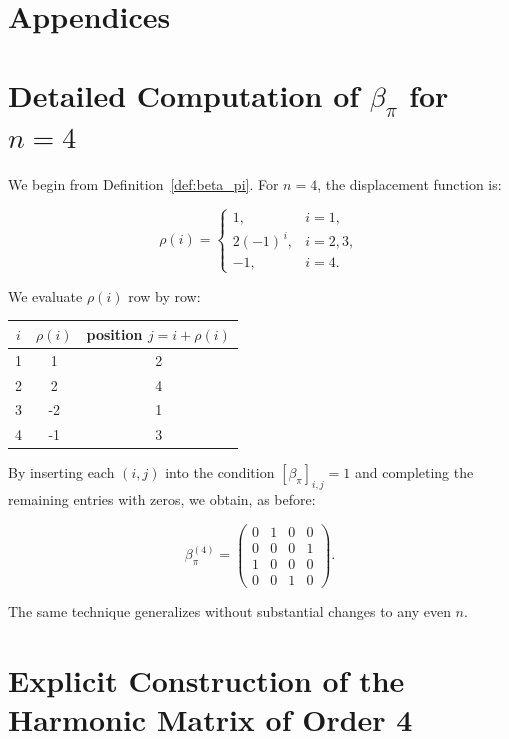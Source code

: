 \documentclass{article}
\begin{document}
\clearpage
\appendix
\section*{Appendices}

\section{Detailed Computation of \(\beta_\pi\) for \(n = 4\)}
\label{app:beta_pi_n4}

We begin from Definition~\ref{def:beta_pi}.  
For \(n = 4\), the displacement function is:

\[
\rho(i) =
\begin{cases}
1, & i = 1,\\[2pt]
2(-1)^{\,i}, & i = 2,3,\\[2pt]
-1, & i = 4.
\end{cases}
\]

We evaluate \(\rho(i)\) row by row:


\begin{center}
\begin{tabular}{c|c|c}
\(i\) & \(\rho(i)\) & position \(j = i + \rho(i)\) \\\hline
1   & 1  & 2  \\
2   & 2  & 4  \\
3   & -2 & 1  \\
4   & -1 & 3
\end{tabular}
\end{center}

By inserting each \((i, j)\) into the condition \([\beta_\pi]_{i,j} = 1\) and completing the remaining entries with zeros, we obtain, as before:

\[
\beta_\pi^{(4)} =
\begin{pmatrix}
0 & 1 & 0 & 0 \\
0 & 0 & 0 & 1 \\
1 & 0 & 0 & 0 \\
0 & 0 & 1 & 0
\end{pmatrix}.
\]

The same technique generalizes without substantial changes to any even \(n\).

\section{Explicit Construction of the Harmonic Matrix of Order 4}
\label{app:harmonic-construction}
\end{document}
